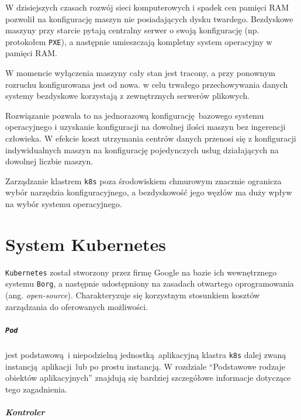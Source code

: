 \documentclass[a4paper,12pt,twoside,openany]{report}
\newcommand{\passthrough}[1]{#1}
\renewcommand{\href}[2]{#2\endnote{\url{#1}}}
\begin{document}
W dzisiejszych czasach rozwój sieci komputerowych i spadek cen pamięci
RAM pozwolił na konfigurację maszyn nie posiadających dysku twardego.
Bezdyskowe maszyny przy starcie pytają centralny serwer o swoją
konfigurację (np. protokołem \passthrough{\lstinline!PXE!}), a następnie
umieszczają kompletny system operacyjny w pamięci RAM.

W momencie wyłączenia maszyny cały stan jest tracony, a przy ponownym
rozruchu konfigurowana jest od nowa. w celu trwałego przechowywania
danych systemy bezdyskowe korzystają z zewnętrznych serwerów plikowych.

Rozwiązanie pozwala to na jednorazową konfigurację~bazowego systemu
operacyjnego i uzyskanie konfiguracji na dowolnej ilości maszyn bez
ingerencji człowieka. W efekcie koszt utrzymania centrów danych przenosi
się z konfiguracji indywidualnych maszyn na konfigurację pojedynczych
usług działających na dowolnej liczbie maszyn.

Zarządzanie klastrem \passthrough{\lstinline!k8s!} poza środowiskiem
chmurowym znacznie ogranicza wybór narzędzia konfiguracyjnego, a
bezdyskowość jego węzłów ma duży wpływ na wybór systemu operacyjnego.

\hypertarget{system-kubernetes}{%
\chapter{System Kubernetes}\label{system-kubernetes}}

\href{https://kubernetes.io/}{\passthrough{\lstinline!Kubernetes!}}
został stworzony przez firmę Google na bazie ich wewnętrznego systemu
\passthrough{\lstinline!Borg!}, a następnie udostępniony na zasadach
otwartego oprogramowania (ang. \emph{open-source}). Charakteryzuje się
korzystnym stosunkiem kosztów zarządzania do oferowanych możliwości.

\hypertarget{pod}{%
\paragraph{\texorpdfstring{\texttt{Pod}}{Pod}}\label{pod}}

jest podstawową~i niepodzielną jednostką~aplikacyjną klastra
\passthrough{\lstinline!k8s!} dalej zwaną instancją~aplikacji~lub po
prostu instancją. W rozdziale ``Podstawowe rodzaje obiektów
aplikacyjnych'' znajdują się bardziej szczegółowe informacje dotyczące
tego zagadnienia.

\hypertarget{kontroler}{%
\paragraph{Kontroler}\label{kontroler}}
\end{document}
